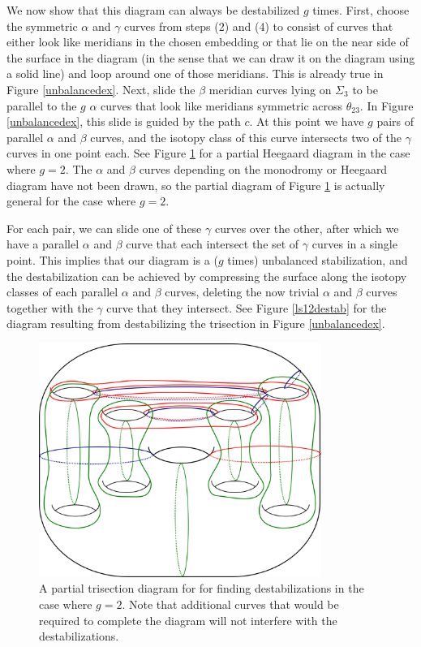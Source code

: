 \documentclass[12pt]{amsart}
\theoremstyle{definition}
\theoremstyle{remark}
\begin{document}
We now show that this diagram can always be destabilized $g$ times.  First, choose the symmetric $\alpha$ and $\gamma$ curves from steps (2) and (4) to consist of curves that either look like meridians in the chosen embedding or that lie on the near side of the surface in the diagram (in the sense that we can draw it on the diagram using a solid line) and loop around one of those meridians.   This is already true in Figure \ref{unbalancedex}.  Next, slide the $\beta$ meridian curves lying on $\Sigma_3$ to be parallel to the $g$ $\alpha$ curves that look like meridians symmetric across $\theta_{23}$.  In Figure \ref{unbalancedex}, this slide is guided by the path $c$.  At this point we have $g$ pairs of parallel $\alpha$ and $\beta$ curves, and the isotopy class of this curve intersects two of the $\gamma$ curves in one point each.  See Figure \ref{destabpartial} for a partial Heegaard diagram in the case where $g=2$.  The $\alpha$ and $\beta$ curves depending on the monodromy or Heegaard diagram have not been drawn, so the partial diagram of Figure \ref{destabpartial} is actually general for the case where $g=2$.

For each pair, we can slide one of these $\gamma$ curves over the other, after which we have a parallel $\alpha$ and $\beta$ curve that each intersect the set of $\gamma$ curves in a single point.  This implies that our diagram is a ($g$ times) unbalanced stabilization, and the destabilization can be achieved by compressing the surface along the isotopy classes of each parallel $\alpha$ and $\beta$ curves, deleting the now trivial $\alpha$ and $\beta$ curves together with the $\gamma$ curve that they intersect.  See Figure \ref{ls12destab} for the diagram resulting from destabilizing the trisection in Figure \ref{unbalancedex}. 

\begin{figure}[h]
\centering
\includegraphics[height=3in]{finddestabpartial.png}
\caption{A partial trisection diagram for for finding destabilizations in the case where $g=2$.  Note that additional curves that would be required to complete the diagram will not interfere with the destabilizations.}
\label{destabpartial}
\end{figure}
\end{document}

